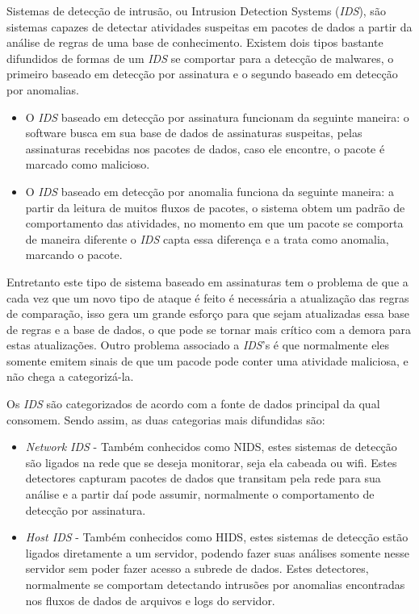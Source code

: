 
Sistemas de detecção de intrusão, ou Intrusion Detection Systems (\textit{IDS}), são sistemas capazes de detectar atividades suspeitas em pacotes de dados a partir da análise de regras de uma base de conhecimento. Existem dois tipos bastante difundidos de formas de um \textit{IDS} se comportar para a detecção de malwares, o primeiro baseado em detecção por assinatura e o segundo baseado em detecção por anomalias.

\begin{itemize}
    \item O \textit{IDS} baseado em detecção por assinatura funcionam da seguinte maneira: o software busca em sua base de dados de assinaturas suspeitas, pelas assinaturas recebidas nos pacotes de dados, caso ele encontre, o pacote é marcado como malicioso. \cite{rehman2003intrusion}
    \item O \textit{IDS} baseado em detecção por anomalia funciona da seguinte maneira: a partir da leitura de muitos fluxos de pacotes, o sistema obtem um padrão de comportamento das atividades, no momento em que um pacote se comporta de maneira diferente o \textit{IDS} capta essa diferença e a trata como anomalia, marcando o pacote. \cite{debar2000introduction}
\end{itemize}


Entretanto este tipo de sistema baseado em assinaturas tem o problema de que a cada vez que um novo tipo de ataque é feito é necessária a atualização das regras de comparação, isso gera um grande esforço para que sejam atualizadas essa base de regras e a base de dados, o que pode se tornar mais crítico com a demora para estas atualizações. Outro problema associado a \textit{IDS}'s é que normalmente eles somente emitem sinais de que um pacode pode conter uma atividade maliciosa, e não chega a categorizá-la.

Os \textit{IDS} são categorizados de acordo com a fonte de dados principal da qual consomem. Sendo assim, as duas categorias mais difundidas são:
\begin{itemize}
    \item \textit{Network IDS} - Também conhecidos como NIDS, estes sistemas de detecção são ligados na rede que se deseja monitorar, seja ela cabeada ou wifi. Estes detectores capturam pacotes de dados que transitam pela rede para sua análise e a partir daí pode assumir, normalmente o comportamento de detecção por assinatura.
    \item \textit{Host IDS} -  Também conhecidos como HIDS, estes sistemas de detecção estão ligados diretamente a um servidor, podendo fazer suas análises somente nesse servidor sem poder fazer acesso a subrede de dados. Estes detectores, normalmente se comportam detectando intrusões por anomalias encontradas nos fluxos de dados de arquivos e logs do servidor. \cite{rehman2003intrusion}
\end{itemize}